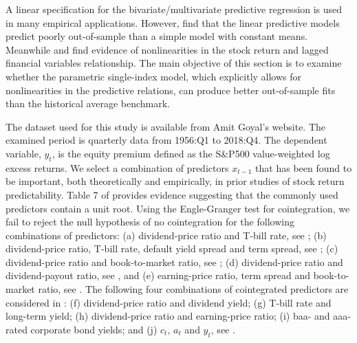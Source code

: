 \documentclass[a4paper,12pt,times,numbered,print,index]{report}
\numberwithin{equation}{section}
\begin{document}
	
	
	A linear specification for the bivariate/multivariate predictive regression is used in many empirical applications. However, \cite{welch2008comprehensive} find that the linear predictive models predict poorly out-of-sample than a simple model with constant means. Meanwhile \cite{qi1999nonlinear} and \cite{zhou2018semiparametric} find evidence of nonlinearities in the stock return and lagged financial variables relationship. The main objective of this section is to examine whether the parametric single-index model, which explicitly allows for nonlinearities in the predictive relations, can produce better out-of-sample fits than the historical average benchmark. 
	
	The dataset used for this study is available from Amit Goyal's website. The examined period is quarterly data from 1956:Q1 to 2018:Q4. The dependent variable, $y_t$, is the equity premium defined as the S\&P500 value-weighted log excess returns. We select a combination of predictors $x_{t-1}$ that has been found to be important, both theoretically and empirically, in prior studies of stock return predictability. Table 7 of \cite{kostakis2015robust} provides evidence suggesting that the commonly used predictors contain a unit root. Using the Engle-Granger test for cointegration, we fail to reject the null hypothesis of no cointegration for the following combinations of predictors: (a) dividend-price ratio and T-bill rate, see \cite{ang2007stock}; (b) dividend-price ratio, T-bill rate, default yield spread and term spread, see \cite{ferson1996measuring}; (c) dividend-price ratio and book-to-market ratio, see \cite{kothari1997book}; (d) dividend-price ratio and dividend-payout ratio,  see \cite{lamont1998earnings}, and (e) earning-price ratio, term spread and book-to-market ratio, see \cite{campbell2004caught}. The following four combinations of cointegrated predictors are considered in \cite{zhou2018semiparametric}: (f) dividend-price ratio and dividend yield; (g) T-bill rate and long-term yield; (h) dividend-price ratio and earning-price ratio; (i) baa- and aaa-rated corporate bond yields; and (j) $c_t$, $a_t$ and $y_t$, see \cite{lettau2001consumption}. 
	
\end{document}
